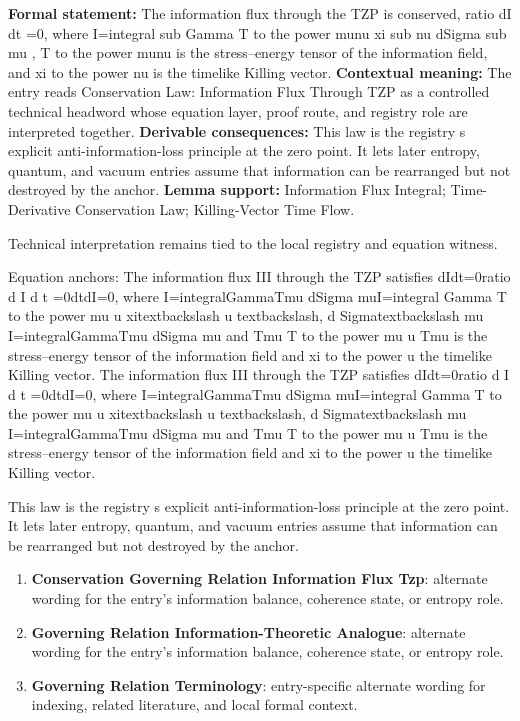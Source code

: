 \begingroup\footnotesize\setlength{\emergencystretch}{3em}\sloppy
\textbf{Formal statement:} The information flux through the TZP is conserved, ratio dI dt =0, where I=integral sub Gamma T to the power munu xi sub nu dSigma sub mu , T to the power munu is the stress--energy tensor of the information field, and xi to the power nu is the timelike Killing vector. \textbf{Contextual meaning:} The entry reads Conservation Law: Information Flux Through TZP as a controlled technical headword whose equation layer, proof route, and registry role are interpreted together. \textbf{Derivable consequences:} This law is the registry s explicit anti-information-loss principle at the zero point. It lets later entropy, quantum, and vacuum entries assume that information can be rearranged but not destroyed by the anchor. \textbf{Lemma support:} Information Flux Integral; Time-Derivative Conservation Law; Killing-Vector Time Flow.\par
\endgroup

Technical interpretation remains tied to the local registry and equation witness.

Equation anchors: The information flux III through the TZP satisfies dIdt=0ratio d I d t =0dtdI=0, where I=integralGammaTmu     dSigma muI=integral Gamma T to the power mu u xitextbackslash u textbackslash, d Sigmatextbackslash mu I=integralGammaTmu    dSigma mu and Tmu T to the power mu u Tmu  is the stress--energy tensor of the information field and   xi to the power u    the timelike Killing vector. The information flux III through the TZP satisfies dIdt=0ratio d I d t =0dtdI=0, where I=integralGammaTmu     dSigma muI=integral Gamma T to the power mu u xitextbackslash u textbackslash, d Sigmatextbackslash mu I=integralGammaTmu    dSigma mu and Tmu T to the power mu u Tmu  is the stress--energy tensor of the information field and   xi to the power u    the timelike Killing vector.

This law is the registry s explicit anti-information-loss principle at the zero point. It lets later entropy, quantum, and vacuum entries assume that information can be rearranged but not destroyed by the anchor.
\endgroup

\begingroup\footnotesize\sloppy
\begin{enumerate}[leftmargin=1.35em,itemsep=1pt,topsep=1pt,parsep=0pt]
\item \textbf{Conservation Governing Relation Information Flux Tzp}: alternate wording for the entry's information balance, coherence state, or entropy role.
\item \textbf{Governing Relation Information-Theoretic Analogue}: alternate wording for the entry's information balance, coherence state, or entropy role.
\item \textbf{Governing Relation Terminology}: entry-specific alternate wording for indexing, related literature, and local formal context.
\end{enumerate}
\endgroup

